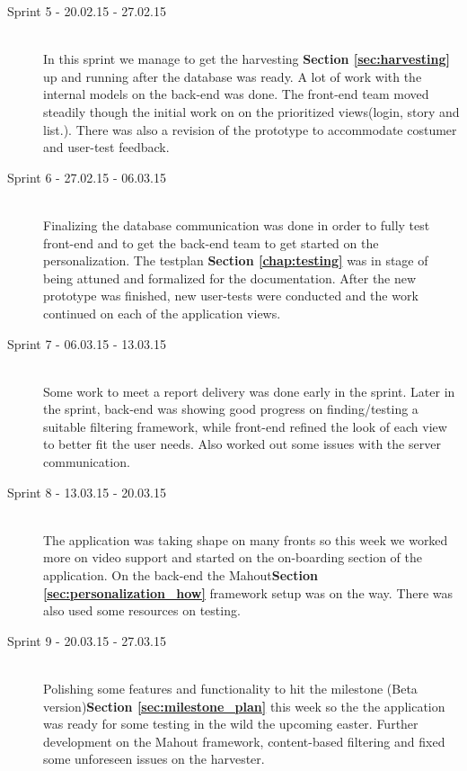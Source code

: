 \begin{description}
	\item[Sprint 5 - 20.02.15 - 27.02.15] \hfill \\ 
	In this sprint we manage to get the harvesting \textbf {Section \ref{sec:harvesting}} up and running after the database was ready. A lot of work with the internal models on the back-end was done. The front-end team moved steadily though the initial work on on the prioritized views(login, story and list.). There was also a revision of the prototype to accommodate costumer and user-test feedback.
		
	\item[Sprint 6 - 27.02.15 - 06.03.15] \hfill \\ 
	Finalizing the database communication was done in order to fully test front-end and to get the back-end team to get started on the personalization. The testplan \textbf {Section \ref*{chap:testing}} was in stage of being attuned and formalized for the documentation. After the new prototype was finished, new user-tests were conducted and the work continued on each of the application views.
	
	\item[Sprint 7 - 06.03.15 - 13.03.15] \hfill \\ 
	Some work to meet a report delivery was done early in the sprint. Later in the sprint, back-end was showing good progress on finding/testing a suitable filtering framework, while front-end refined the look of each view to better fit the user needs. Also worked out some issues with the server communication.
	
	\item[Sprint 8 - 13.03.15 - 20.03.15] \hfill \\ 
	The application was taking shape on many fronts so this week we worked more on video support and started on the on-boarding section of the application. On the back-end the Mahout\textbf {Section \ref{sec:personalization_how}} framework setup was on the way. There was also used some resources on testing.

	\item[Sprint 9 - 20.03.15 - 27.03.15] \hfill \\ 
	Polishing some features and functionality to hit the milestone (Beta version)\textbf {Section \ref{sec:milestone_plan}} this week so the the application was ready for some testing in the wild the upcoming easter. Further development on the Mahout framework, content-based filtering and fixed some unforeseen issues on the harvester.
	

\end{description}
